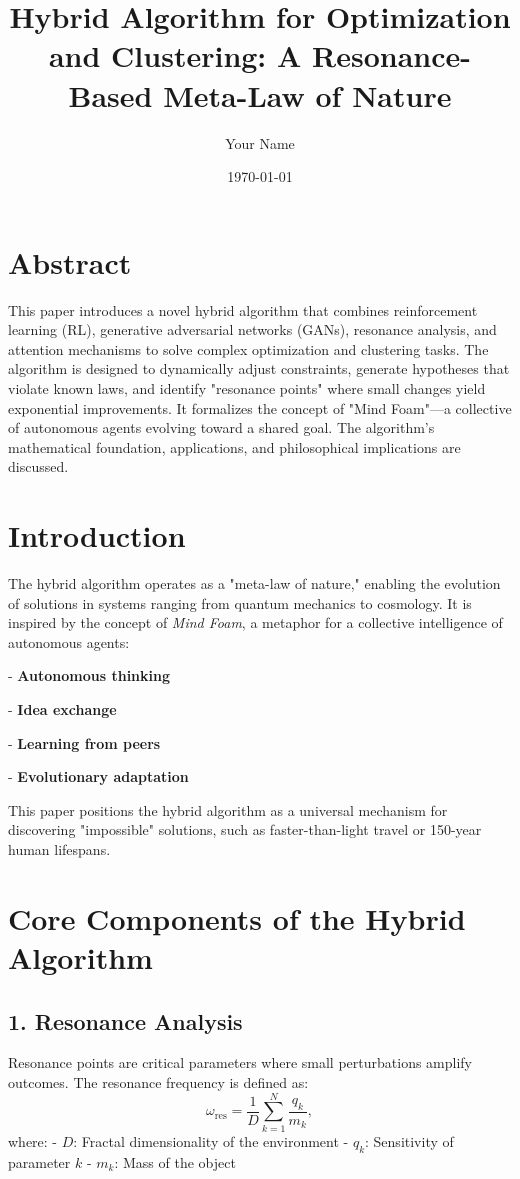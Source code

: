 \documentclass[12pt]{article}
\title{\textbf{Hybrid Algorithm for Optimization and Clustering: A Resonance-Based Meta-Law of Nature}}
\author{Your Name}
\date{\today}
\begin{document}
\maketitle

\section*{Abstract}
This paper introduces a novel hybrid algorithm that combines reinforcement learning (RL), generative adversarial networks (GANs), resonance analysis, and attention mechanisms to solve complex optimization and clustering tasks. The algorithm is designed to dynamically adjust constraints, generate hypotheses that violate known laws, and identify "resonance points" where small changes yield exponential improvements. It formalizes the concept of "Mind Foam"—a collective of autonomous agents evolving toward a shared goal. The algorithm's mathematical foundation, applications, and philosophical implications are discussed.

\section{Introduction}
The hybrid algorithm operates as a "meta-law of nature," enabling the evolution of solutions in systems ranging from quantum mechanics to cosmology. It is inspired by the concept of \textit{Mind Foam}, a metaphor for a collective intelligence of autonomous agents:

    
- \textbf{Autonomous thinking}
    
- \textbf{Idea exchange}
    
- \textbf{Learning from peers}
    
- \textbf{Evolutionary adaptation}


This paper positions the hybrid algorithm as a universal mechanism for discovering "impossible" solutions, such as faster-than-light travel or 150-year human lifespans.

\section{Core Components of the Hybrid Algorithm}
\subsection{1. Resonance Analysis}
Resonance points are critical parameters where small perturbations amplify outcomes. The resonance frequency is defined as:
$$
\omega_{\text{res}} = \frac{1}{D} \sum_{k=1}^N \frac{q_k}{m_k},
$$
where:
- $ D $: Fractal dimensionality of the environment
- $ q_k $: Sensitivity of parameter $ k $
- $ m_k $: Mass of the object
\end{document}
